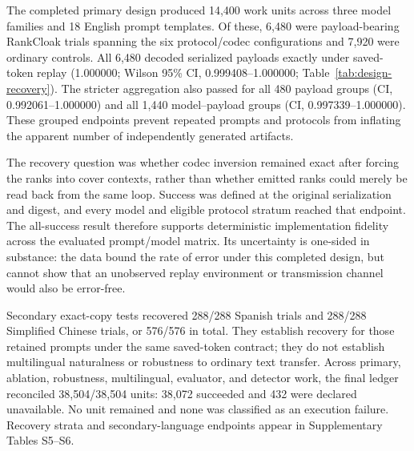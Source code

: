 \documentclass[fleqn,10pt]{wlscirep}
\begin{document}
The completed primary design produced 14,400 work units across three model families and 18 English prompt templates. Of these, 6,480 were payload-bearing RankCloak trials spanning the six protocol/codec configurations and 7,920 were ordinary controls. All 6,480 decoded serialized payloads exactly under saved-token replay (1.000000; Wilson 95\% CI, 0.999408--1.000000; Table~\ref{tab:design-recovery}). The stricter aggregation also passed for all 480 payload groups (CI, 0.992061--1.000000) and all 1,440 model--payload groups (CI, 0.997339--1.000000). These grouped endpoints prevent repeated prompts and protocols from inflating the apparent number of independently generated artifacts.

The recovery question was whether codec inversion remained exact after forcing the ranks into cover contexts, rather than whether emitted ranks could merely be read back from the same loop. Success was defined at the original serialization and digest, and every model and eligible protocol stratum reached that endpoint. The all-success result therefore supports deterministic implementation fidelity across the evaluated prompt/model matrix. Its uncertainty is one-sided in substance: the data bound the rate of error under this completed design, but cannot show that an unobserved replay environment or transmission channel would also be error-free.

Secondary exact-copy tests recovered 288/288 Spanish trials and 288/288 Simplified Chinese trials, or 576/576 in total. They establish recovery for those retained prompts under the same saved-token contract; they do not establish multilingual naturalness or robustness to ordinary text transfer. Across primary, ablation, robustness, multilingual, evaluator, and detector work, the final ledger reconciled 38,504/38,504 units: 38,072 succeeded and 432 were declared unavailable. No unit remained and none was classified as an execution failure. Recovery strata and secondary-language endpoints appear in Supplementary Tables S5--S6.
\end{document}
